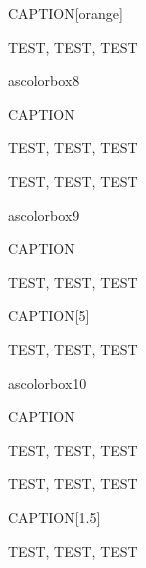 \begin{ascolorbox5}{CAPTION}[orange]

TEST, TEST, TEST

\end{ascolorbox5}

ascolorbox8

\begin{ascolorbox8}{CAPTION}

TEST, TEST, TEST

\end{ascolorbox8}

\begin{ascolorbox8}{}

TEST, TEST, TEST

\end{ascolorbox8}

ascolorbox9

\begin{ascolorbox9}{CAPTION}

TEST, TEST, TEST

\end{ascolorbox9}




\begin{ascolorbox9}{CAPTION}[5]

TEST, TEST, TEST

\end{ascolorbox9}

ascolorbox10

\begin{ascolorbox10}{CAPTION}

TEST, TEST, TEST

\end{ascolorbox10}

\begin{ascolorbox10}{}

TEST, TEST, TEST

\end{ascolorbox10}

\begin{ascolorbox10}{CAPTION}[1.5]

TEST, TEST, TEST

\end{ascolorbox10}


